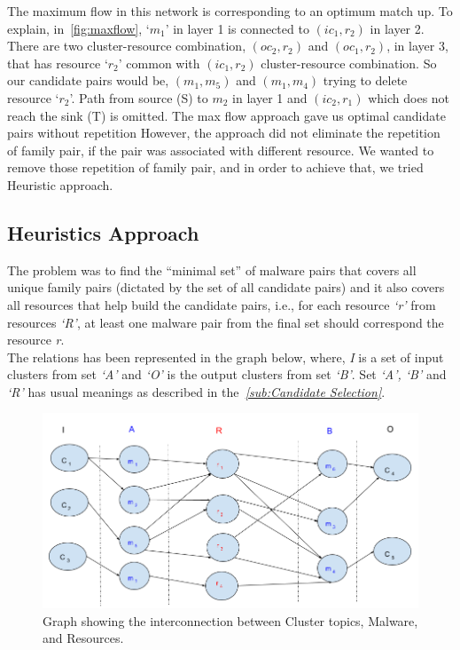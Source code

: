 The maximum flow in this network is corresponding to an optimum match up.
To explain, in~\autoref{fig:maxflow}, `$m_1$' in layer 1 is connected to $(ic_1,r_2)$ in layer 2.
There are two cluster-resource combination, $(oc_2,r_2)$ and $(oc_1,r_2)$, in layer 3, that has resource `$r_2$' common with $(ic_1,r_2)$ cluster-resource combination.
So our candidate pairs would be, $(m_1,m_5)$ and $(m_1,m_4)$ trying to delete resource `$r_2$'.
Path from source (S) to $m_2$ in layer 1 and $(ic_2,r_1)$ which does not reach the sink (T) is omitted.
The max flow approach gave us optimal candidate pairs without repetition
However, the approach did not eliminate the repetition of family pair, if the pair was associated with different resource.
We wanted to remove those repetition of family pair, and in order to achieve that, we tried Heuristic approach.
\subsection{Heuristics Approach}
\label{sub:Heuristics Approach}
The problem was to find the ``minimal set'' of malware pairs that covers all unique family pairs (dictated by the set of all candidate pairs) and it also covers all resources that help build the candidate pairs, i.e., for each resource \emph{`r'} from resources \emph{`R'}, at least one malware pair from the final set should correspond the resource \emph{r}.\\

The relations has been represented in the graph below, where, \emph{I} is a set of input clusters from set \emph{`A'} and \emph{`O'} is the output clusters from set \emph{`B'}. Set \emph{`A', `B'} and \emph{`R'} has usual meanings as described in the\textit{~\autoref{sub:Candidate Selection}}.
\begin{figure}[htbp]
  \centering
  \includegraphics[scale=0.45]{figures/dhkheuristics.png}
  \caption[]{Graph showing the interconnection between Cluster topics, Malware, and Resources.}\label{fig:dhkheuristics}
\end{figure}
\\

